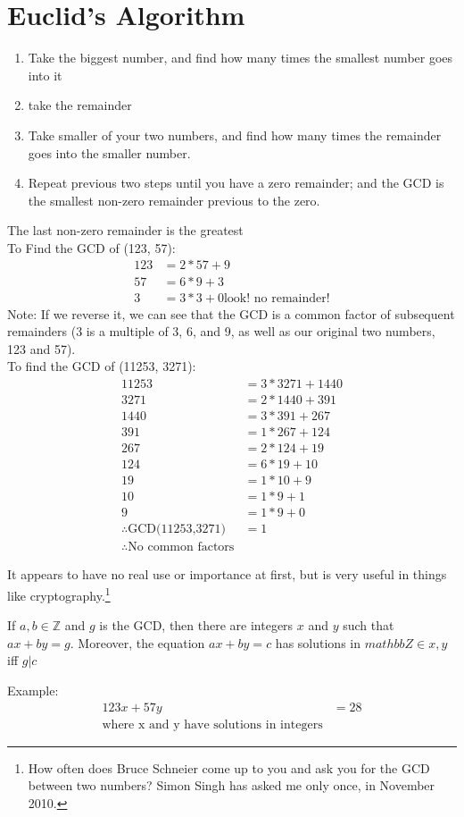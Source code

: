 \section{Euclid's Algorithm}
\label{sec:EuclidsAlgorithm}
\begin{enumerate}
  \item Take the biggest number, and find how many times the smallest number
  goes into it
  \item take the remainder
  \item Take smaller of your two numbers, and find how many times the
  remainder goes into the smaller number.
  \item Repeat previous two steps until you have a zero remainder; and the GCD
  is the smallest non-zero remainder previous to the zero.
\end{enumerate}
The last non-zero remainder is the greatest
\\
To Find the GCD of (123, 57):
\begin{align}
  123 & = 2 * 57 + 9 \\
   57 & = 6 * 9 + 3 \\
    3 & = 3 * 3 + 0 \text{look! no remainder!}
\end{align}
Note: If we reverse it, we can see that the GCD is a common factor of subsequent
remainders (3 is a multiple of 3, 6, and 9, as well as our original two
numbers, 123 and 57).
\\
To find the GCD of (11253, 3271):
\begin{align}
  11253 & = 3 * 3271 + 1440 \\
   3271 & = 2 * 1440 + 391 \\
   1440 & = 3 * 391 + 267 \\
    391 & = 1 * 267 + 124 \\
    267 & = 2 * 124 + 19 \\
    124 & = 6 * 19 + 10 \\
     19 & = 1 * 10 + 9 \\
     10 & = 1 * 9 + 1 \\
      9 & = 1 * 9 + 0 \\
      \therefore \text{GCD(11253,3271)} & = 1 \\
      \therefore \text{No common factors}
\end{align}

It appears to have no real use or importance at first, but is very
useful in things like cryptography.\footnote{How often does Bruce Schneier come
up to you and ask you for the GCD between two numbers? Simon Singh has asked me
only once, in November 2010.}

If $a, b \in \mathbb{Z}$ and $g$ is the GCD, then there are integers $x$ and $y$
such that $ax + by = g$. Moreover, the equation $ax + by = c$ has solutions in
$mathbb{Z} \in x,y$ iff $g|c$

Example:
\begin{align}
  123x + 57y & = 28 \\
  \text{where x and y have solutions in integers}
\end{align}
